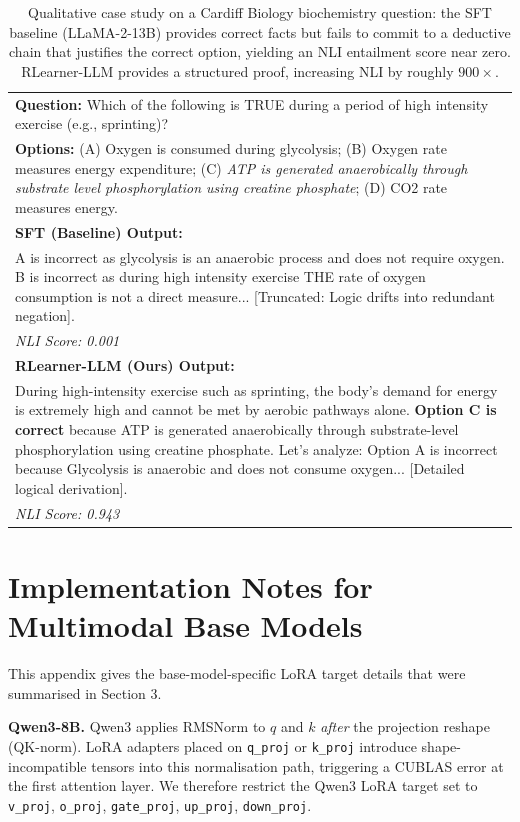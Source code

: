 \begin{table}[h]
\centering
\small
\begin{tabular}{p{}}
\toprule
\textbf{Question:} Which of the following is TRUE during a period of high intensity exercise (e.g., sprinting)? \\
\textbf{Options:} (A) Oxygen is consumed during glycolysis; (B) Oxygen rate measures energy expenditure; (C) \textit{ATP is generated anaerobically through substrate level phosphorylation using creatine phosphate}; (D) CO2 rate measures energy. \\
\midrule
\textbf{SFT (Baseline) Output:} \\
A is incorrect as glycolysis is an anaerobic process and does not require oxygen. B is incorrect as during high intensity exercise THE rate of oxygen consumption is not a direct measure... [Truncated: Logic drifts into redundant negation]. \\
\textit{NLI Score: 0.001} \\
\midrule
\textbf{RLearner-LLM (Ours) Output:} \\
During high-intensity exercise such as sprinting, the body's demand for energy is extremely high and cannot be met by aerobic pathways alone. \textbf{Option C is correct} because ATP is generated anaerobically through substrate-level phosphorylation using creatine phosphate. Let's analyze: Option A is incorrect because Glycolysis is anaerobic and does not consume oxygen... [Detailed logical derivation]. \\
\textit{NLI Score: 0.943} \\
\bottomrule
\end{tabular}
\caption{Qualitative case study on a Cardiff Biology biochemistry question: the SFT baseline (LLaMA-2-13B) provides correct facts but fails to commit to a deductive chain that justifies the correct option, yielding an NLI entailment score near zero. RLearner-LLM provides a structured proof, increasing NLI by roughly $900\times$.}
\label{tab:case_study}
\end{table}

\section{Implementation Notes for Multimodal Base Models}
\label{sec:impl_notes_appendix}

This appendix gives the base-model-specific LoRA target details that were summarised in Section 3.

\textbf{Qwen3-8B.} Qwen3 applies RMSNorm to $q$ and $k$ \emph{after} the projection reshape (QK-norm). LoRA adapters placed on \texttt{q\_proj} or \texttt{k\_proj} introduce shape-incompatible tensors into this normalisation path, triggering a CUBLAS error at the first attention layer. We therefore restrict the Qwen3 LoRA target set to \texttt{v\_proj}, \texttt{o\_proj}, \texttt{gate\_proj}, \texttt{up\_proj}, \texttt{down\_proj}.

